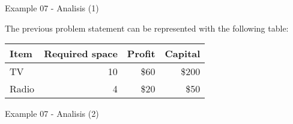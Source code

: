 \begin{frame}{Example 07 - Analisis (1)}

The previous problem statement can be represented with the following table:

\begin{center}
\begin{tabular}{lrrr}
\hline
  \cellcolor{gray90}\textbf{Item}
& \cellcolor{gray90}\textbf{Required space}
& \cellcolor{gray90}\textbf{Profit}
& \cellcolor{gray90}\textbf{Capital} \\
\hline
TV    & 10 & \$60 & \$200 \\
Radio &  4 & \$20 &  \$50 \\
\hline
\end{tabular}
\end{center}

\end{frame}

\begin{frame}{Example 07 - Analisis (2)}
\end{frame}

